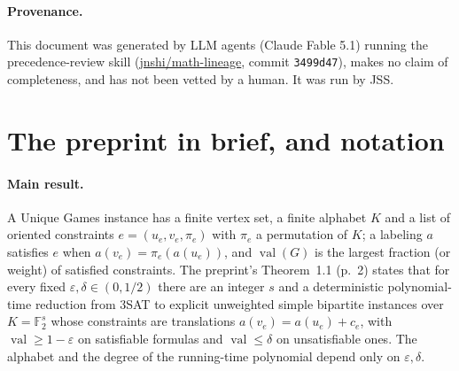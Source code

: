 \documentclass[11pt]{article}
\newcommand{\ploc}[2]{#1}
\begin{document}
\paragraph{Provenance.}
This document was generated by LLM agents (Claude Fable 5.1) running the
precedence-review skill
(\href{https://github.com/jnshi/math-lineage/tree/3499d47/.agents/skills/precedence-review}{jnshi/math-lineage},
commit \texttt{3499d47}), makes no claim of completeness, and has not been
vetted by a human. It was run by JSS.
\space%
\section{The preprint in brief, and notation}\label{sec:overview}

\paragraph{Main result.}
A Unique Games instance has a finite vertex set, a finite alphabet $K$ and a
list of oriented constraints $e=(u_e,v_e,\pi_e)$ with $\pi_e$ a permutation of
$K$; a labeling $a$ satisfies $e$ when $a(v_e)=\pi_e(a(u_e))$, and $\operatorname{val}(G)$ is
the largest fraction (or weight) of satisfied constraints. The preprint's
\ploc{Theorem~1.1 (p.~2)}{00-introduction.tex:22--39} states that for every
fixed $\varepsilon,\delta\in(0,1/2)$ there are an integer $s$ and a
deterministic polynomial-time reduction from 3SAT to explicit unweighted simple
bipartite instances over $K=\mathbb F_2^{s}$ whose constraints are translations
$a(v_e)=a(u_e)+c_e$, with $\operatorname{val}\ge1-\varepsilon$ on satisfiable formulas and
$\operatorname{val}\le\delta$ on unsatisfiable ones. The alphabet and the degree of the
running-time polynomial depend only on $\varepsilon,\delta$.
\end{document}
